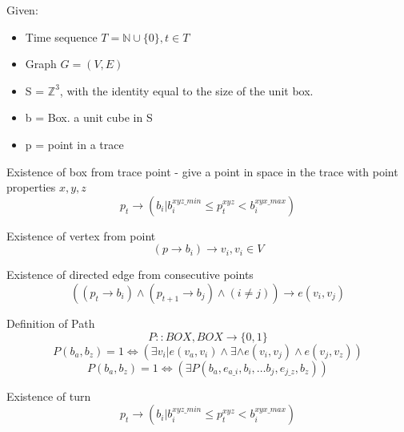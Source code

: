 \documentclass{article}
\newcommand\N{\mathbb{N}}
\begin{document}
Given:\\
\begin{itemize}
    \setlength\itemsep{0.2em}
\item Time sequence $T =  \N \cup \{0\}, t \in T$\\
\item Graph $G = (V,E)$
\item S = $\mathbb{Z}^3$, with the identity equal to the size of the unit box.
\item b = Box.  a unit cube in S 
\item p = point in a trace 
\end{itemize}


Existence of box from trace point - give a point in space in the trace with point properties $x,y,z$ 
$$p_t \rightarrow (b_i | b_i^{xyz\_min} \leq p_t^{xyz} < b_i^{xyx\_max})$$

Existence of vertex from point
$$(p \rightarrow b_i) \rightarrow v_i, v_i \in V$$

Existence of directed edge from consecutive points
$$((p_t \rightarrow b_i) \land (p_{t+1} \rightarrow b_j) \land (i \neq j)) \rightarrow e(v_i, v_j) $$

Definition of Path
$$P ::  BOX, BOX \rightarrow \{0,1\}$$
$$P(b_a, b_z) = 1 \Leftrightarrow (\exists v_i | e(v_a, v_i) \land \exists \land e(v_i, v_j) \land e(v_j, v_z)) $$
$$P(b_a, b_z) = 1 \Leftrightarrow (\exists P(b_a, e_{a\_i}, b_i, \dots b_j, e_{j\_z}, b_z)) $$


Existence of turn
$$p_t \rightarrow (b_i | b_i^{xyz\_min} \leq p_t^{xyz} < b_i^{xyx\_max})$$
\end{document}
